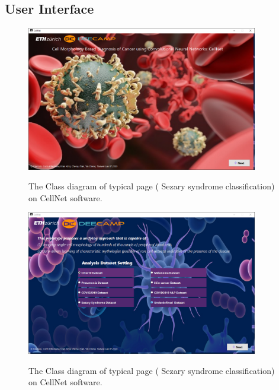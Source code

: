 \subsection{User Interface} %
\label{sub:amet}

\begin{figure}[t]
\begin{center}
\includegraphics[height=0.3\textheight,width=0.9\textwidth]{thesis-template-master/images/cellnet1page.PNG}
\label{fig:cellnet}
\end{center}
\caption{ The Class diagram of typical page ( Sezary syndrome classification) on CellNet software.}
\end{figure}


\begin{figure}[t]
\begin{center}
\includegraphics[height=0.3\textheight,width=0.9\textwidth]{thesis-template-master/images/cellnet2page.PNG}
\label{fig:cellnet}
\end{center}
\caption{ The Class diagram of typical page ( Sezary syndrome classification) on CellNet software.}
\end{figure}


